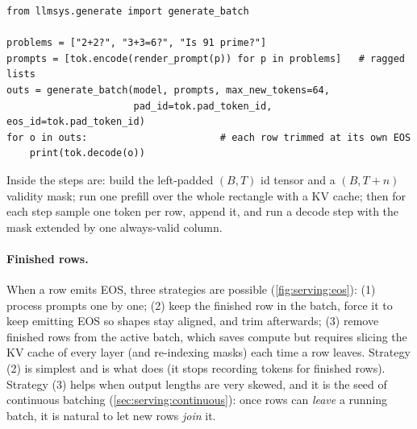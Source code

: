 \begin{lstlisting}[caption={Left-padded batched generation with the core helper.},label={lst:serving:batch}]
from llmsys.generate import generate_batch

problems = ["2+2?", "3+3=6?", "Is 91 prime?"]
prompts = [tok.encode(render_prompt(p)) for p in problems]   # ragged lists
outs = generate_batch(model, prompts, max_new_tokens=64,
                      pad_id=tok.pad_token_id, eos_id=tok.pad_token_id)
for o in outs:                       # each row trimmed at its own EOS
    print(tok.decode(o))
\end{lstlisting}

Inside  the steps are: build the left-padded $(B,T)$ id tensor and a
$(B,T+n)$ validity mask; run one prefill over the whole rectangle with a KV cache; then for each
step sample one token per row, append it, and run a decode step with the mask extended by one
always-valid column.

\paragraph{Finished rows.} When a row emits EOS, three strategies are possible
(\cref{fig:serving:eos}): (1) process prompts one by one; (2) keep the finished row in the batch,
force it to keep emitting EOS so shapes stay aligned, and trim afterwards; (3) remove finished
rows from the active batch, which saves compute but requires slicing the KV cache of every layer
(and re-indexing masks) each time a row leaves. Strategy (2) is simplest and is what
 does (it stops recording tokens for finished rows). Strategy (3) helps when
output lengths are very skewed, and it is the seed of continuous batching (\cref{sec:serving:continuous}):
once rows can \emph{leave} a running batch, it is natural to let new rows \emph{join} it.


